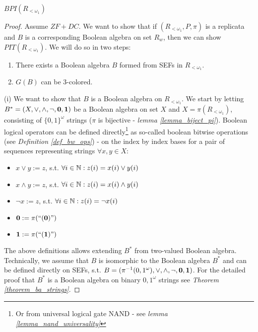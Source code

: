 \begin{lemma}\label{lemma_bpi_rw}
  $BPI(R_{<\omega_1})$
\end{lemma}
\begin{proof}
  Assume $ZF+DC$. We want to show that if $(R_{<\omega_1}, P, \pi)$ is a replicata and $B$ is a corresponding Boolean algebra on set $R_w$, then we can show $PIT(R_{<\omega_1})$. We will do so in two steps:
  \begin{enumerate}[label=(\roman*)]
    \item There exists a Boolean algebra $B$ formed from SEFs in $R_{<\omega_1}$.
    \item $G(B)$ can be 3-colored.
  \end{enumerate}
  
  (i) We want to show that $B$ is a Boolean algebra on $R_{<\omega_1}$. We start by letting $B^* = (X,\lor,\land,\neg,\bf{0},\bf{1})$ be a Boolean algebra on set $X$ and $X = \pi(R_{<\omega_1})$, consisting of $\{0,1\}^\omega$ strings ($\pi$ is bijective - \textit{lemma \ref{lemma_biject_pi}}). Boolean logical operators can be defined directly\footnote{Or from universal logical gate NAND - see \textit{lemma \ref{lemma_nand_universality}}} as so-called boolean bitwise operations (see \textit{Definition \ref{def_bw_ops}}) - on the index by index bases for a pair of sequences representing strings $\forall x,y \in X$:
  \begin{itemize}
    \item $x \lor y := z$, s.t. $\forall i \in \mathbb{N}: z(i) = x(i) \lor y(i)$
    \item $x \land y := z$, s.t. $\forall i \in \mathbb{N}: z(i) = x(i) \land y(i)$ 
    \item $\neg x  := z$, s.t. $\forall i \in \mathbb{N}: z(i) = \neg x(i)$ 
    \item $\bf{0} := \pi(\text{``} (0) \text{''}) $
    \item $\bf{1} := \pi(\text{``} (1) \text{''}) $
  \end{itemize}
  The above definitions allows extending $B^*$ from two-valued Boolean algebra. Technically, we assume that $B$ is isomorphic to the Boolean algebra $B^*$ and can be defined directly on SEFs, s.t. $B = (\pi^{-1}({0,1}^\omega),\lor,\land,\neg,\bf{0},\bf{1})$. For the detailed proof that $B^*$ is a Boolean algebra on binary ${0,1}^\omega$ strings see \textit{Theorem \ref{theorem_ba_strings}}.


\end{proof}
